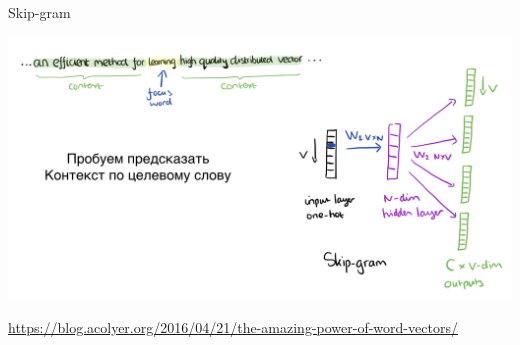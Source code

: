 \documentclass[notes,12pt, aspectratio=169]{beamer}
\begin{document}
\begin{frame}{Skip-gram}
\begin{center}
\includegraphics[width=.9\linewidth]{skipgram.png}
\end{center}
\vfill
\footnotesize  {\color{blue} \url{https://blog.acolyer.org/2016/04/21/the-amazing-power-of-word-vectors/}}
\end{frame} 
\end{document}
